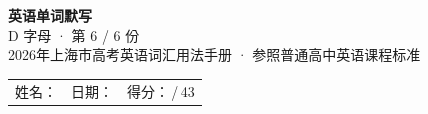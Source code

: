 \documentclass[10pt,a4paper]{article}
\begin{document}
\pagestyle{plain}

\begin{center}
{\LARGE\bfseries 英语单词默写}\\[0.22em]
{\large D 字母 · 第 6 / 6 份}\\[0.18em]
{\small 2026年上海市高考英语词汇用法手册 · 参照普通高中英语课程标准}
\end{center}

\vspace{0.25em}
\noindent\begin{tabular}{@{}p{}@{}p{}@{}p{}@{}}
姓名：\underline{\hspace{2.0cm}} & 日期：\underline{\hspace{2.0cm}} & 得分：\underline{\hspace{1.3cm}}\,/\,43 \\
\end{tabular}

\vspace{0.3em}

\vspace{0.08em}
\end{document}
